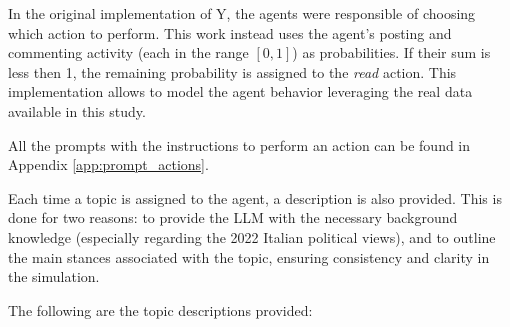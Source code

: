 \medskip
In the original implementation of Y, the agents were responsible of choosing which action to perform.
This work instead uses the agent's posting and commenting activity (each in the range $[0,1]$) as probabilities. If their sum is less then 1, the remaining probability is assigned to the \textit{read} action.
This implementation allows to model the agent behavior leveraging the real data available in this study.


All the prompts with the instructions to perform an action can be found in Appendix \ref{app:prompt_actions}.

\medskip
Each time a topic is assigned to the agent, a description is also provided.
This is done for two reasons: to provide the LLM with the necessary background knowledge (especially regarding the 2022 Italian political views), and to outline the main stances associated with the topic, ensuring consistency and clarity in the simulation.

The following are the topic descriptions provided:


